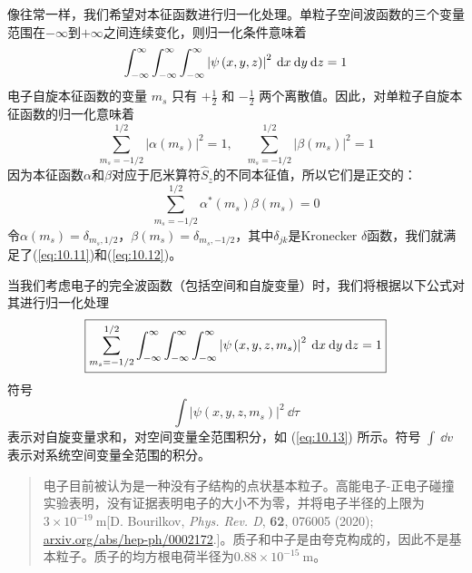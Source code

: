     像往常一样，我们希望对本征函数进行归一化处理。单粒子空间波函数的三个变量范围在$-\infty$到$+\infty$之间连续变化，则归一化条件意味着
    \begin{equation*}
        \int_{-\infty}^{\infty} \int_{-\infty}^{\infty} \int_{-\infty}^{\infty} \left|\psi\left(x, y, z\right)\right|^2\: \dd x\: \dd y\: \dd z = 1
    \end{equation*}
    电子自旋本征函数的变量 $m_s$ 只有 $+\frac{1}{2}$ 和 $-\frac{1}{2}$ 两个离散值。因此，对单粒子自旋本征函数的归一化意味着
    \begin{equation}
        \sum_{m_{s}=-1/2}^{1/2} \left|\alpha \left(m_{s}\right)\right|^{2} = 1, \quad \sum_{m_{s}=-1/2}^{1/2} \left|\beta \left(m_{s}\right)\right|^{2} = 1
        \label{eq:10.11}
    \end{equation}
    因为本征函数$\alpha$和$\beta$对应于厄米算符$\hat{S}_z$的不同本征值，所以它们是正交的：
    \begin{equation}
        \sum_{m_{s}=-1/2}^{1/2} \alpha^ * \left(m_{s}\right) \beta \left(m_{s}\right) = 0
        \label{eq:10.12}
    \end{equation}
    令$\alpha\left(m_s\right) = \delta_{m_s, 1/2}$，$\beta\left(m_s\right) = \delta_{m_s, -1/2}$，其中$\delta_{jk}$是Kronecker $\delta$函数，我们就满足了(\ref{eq:10.11})和(\ref{eq:10.12})。

    当我们考虑电子的完全波函数（包括空间和自旋变量）时，我们将根据以下公式对其进行归一化处理
    \begin{equation}
        \boxed{
            \sum_{m_s=-1/2}^{1/2} \int_{-\infty}^{\infty} \int_{-\infty}^{\infty} \int_{-\infty}^{\infty} \left|\psi\left(x, y, z, m_s\right)\right|^2 \:\dd x \:\dd y \:\dd z = 1
        }
        \label{eq:10.13}
    \end{equation}
    符号
    \begin{equation*}
        \int \left|\psi\left(x, y, z, m_s\right)\right|^2 \:\dd \tau
    \end{equation*}
    表示对自旋变量求和，对空间变量全范围积分，如 (\ref{eq:10.13}) 所示。符号 $\int \:\dd v$ 表示对系统空间变量全范围的积分。

    \begin{quote}
        \small
        \noindent
        电子目前被认为是一种没有子结构的点状基本粒子。高能电子-正电子碰撞实验表明，没有证据表明电子的大小不为零，并将电子半径的上限为$3 \times 10^{-19} \:\mathrm{m}$[D. Bourilkov, \textit{Phys. Rev. D}, \textbf{62}, 076005 (2020); \url{arxiv.org/abs/hep-ph/0002172}.]。质子和中子是由夸克构成的，因此不是基本粒子。质子的均方根电荷半径为$0.88 \times 10^{-15} \:\mathrm{m}$。
    \end{quote}

